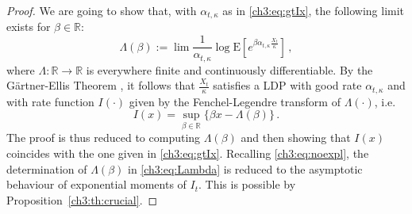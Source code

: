 \documentclass[a4paper,reqno,11pt]{amsart}
\numberwithin{equation}{section}
\newcommand{\R}{\mathbb{R}}
\newcommand{\PEfont}{\mathrm}
\newcommand{\E}{\ensuremath{\PEfont E}}
\begin{document}
\begin{proof}
We are going to show that, with $\alpha_{t,\kappa}$ as in \eqref{ch3:eq:gtIx},
the following limit exists for $\beta\in\R$:
\begin{equation} \label{ch3:eq:Lambda}
	\Lambda(\beta) := \lim
	\frac{1}{\alpha_{t,\kappa}} \log \E[e^{\beta \alpha_{t,\kappa}
	\frac{X_t}{\kappa}}] \,,
\end{equation}
where $\Lambda: \R \to \R$ is everywhere finite and continuously differentiable.
By the G\"artner-Ellis Theorem \cite[Theorem 2.3.6]{cf:DZ},
it follows that $\frac{X_t}{\kappa}$ satisfies a LDP with good
rate $\alpha_{t,\kappa}$ and with rate function $I(\cdot)$ given
by the Fenchel-Legendre transform of $\Lambda(\cdot)$, i.e.
\begin{equation} \label{ch3:eq:Legendre}
	I(x) = \sup_{\beta \in \R} \big\{ \beta x - \Lambda(\beta) \big\} \,.
\end{equation}
The proof is thus reduced to
computing $\Lambda(\beta)$ and then showing that $I(x)$ coincides
with the one given in \eqref{ch3:eq:gtIx}.
Recalling \eqref{ch3:eq:noexpl},
the determination of $\Lambda(\beta)$ in 
\eqref{ch3:eq:Lambda} is reduced to the asymptotic 
behaviour of exponential moments of $I_t$.
This is possible by Proposition~\ref{ch3:th:crucial}.




\end{proof}
\end{document}
